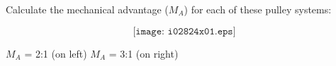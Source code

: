 

Calculate the mechanical advantage ($M_A$) for each of these pulley systems:

$$\texttt{[image: i02824x01.eps]}$$







$M_A$ = 2:1 (on left) \hskip 30pt $M_A$ = 3:1 (on right)











